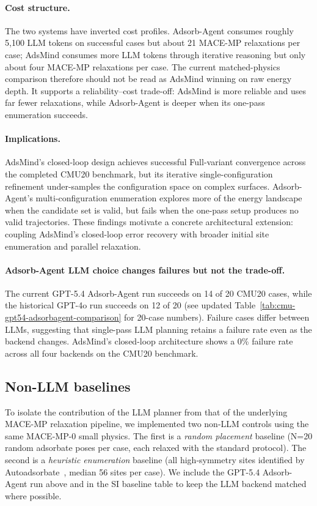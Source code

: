 \paragraph{Cost structure.}
The two systems have inverted cost profiles.
Adsorb-Agent consumes roughly 5{,}100 LLM tokens on successful cases but about 21 MACE-MP relaxations per case; AdsMind consumes more LLM tokens through iterative reasoning but only about four MACE-MP relaxations per case.
The current matched-physics comparison therefore should not be read as AdsMind winning on raw energy depth.
It supports a reliability--cost trade-off: AdsMind is more reliable and uses far fewer relaxations, while Adsorb-Agent is deeper when its one-pass enumeration succeeds.

\paragraph{Implications.}
AdsMind's closed-loop design achieves successful Full-variant convergence across the completed CMU20 benchmark, but its iterative single-configuration refinement under-samples the configuration space on complex surfaces.
Adsorb-Agent's multi-configuration enumeration explores more of the energy landscape when the candidate set is valid, but fails when the one-pass setup produces no valid trajectories.
These findings motivate a concrete architectural extension: coupling AdsMind's closed-loop error recovery with broader initial site enumeration and parallel relaxation.

\paragraph{Adsorb-Agent LLM choice changes failures but not the trade-off.}
The current GPT-5.4 Adsorb-Agent run succeeds on 14 of 20 CMU20 cases, while the historical GPT-4o run succeeds on 12 of 20 (see updated Table~\ref{tab:cmu-gpt54-adsorbagent-comparison} for 20-case numbers).
Failure cases differ between LLMs, suggesting that single-pass LLM planning retains a failure rate even as the backend changes.
AdsMind's closed-loop architecture shows a 0\% failure rate across all four backends on the CMU20 benchmark.

\subsection{Non-LLM baselines}

To isolate the contribution of the LLM planner from that of the underlying MACE-MP relaxation pipeline, we implemented two non-LLM controls using the same MACE-MP-0 small physics. The first is a \textit{random placement} baseline (N=20 random adsorbate poses per case, each relaxed with the standard protocol). The second is a \textit{heuristic enumeration} baseline (all high-symmetry sites identified by Autoadsorbate~\cite{fako2025simple}, median 56 sites per case).
We include the GPT-5.4 Adsorb-Agent run above and in the SI baseline table to keep the LLM backend matched where possible.

